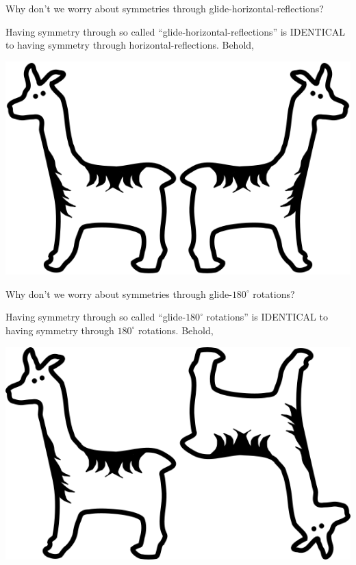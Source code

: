 \documentclass[noauthor,nooutcomes,hints,handout]{ximera}
\begin{document}
\begin{question}
  Why don't we worry about symmetries through
  glide-horizontal-reflections?
  \begin{freeResponse}
    Having symmetry through so called ``glide-horizontal-reflections''
    is IDENTICAL to having symmetry through
    horizontal-reflections. Behold,
    \begin{center}
      \includegraphics[width=.3\textwidth]{llamaGHF.png}
    \end{center}
  \end{freeResponse}
\end{question}
\mynewpage

\begin{question}
  Why don't we worry about symmetries through glide-$180^\circ$
  rotations?
  \begin{freeResponse}
    Having symmetry through so called ``glide-$180^\circ$ rotations''
    is IDENTICAL to having symmetry through
    $180^\circ$ rotations. Behold,
    \begin{center}
      \includegraphics[width=.3\textwidth]{llamaGR.png}
    \end{center}
  \end{freeResponse}
\end{question}
\mynewpage
\end{document}
